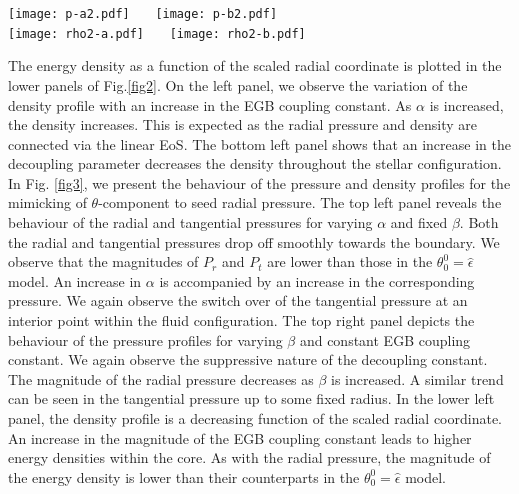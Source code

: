 \documentclass[]{aastex631}
\begin{document}
\begin{figure*}
    \centering
    \texttt{[image: p-a2.pdf]}~~~ \texttt{[image: p-b2.pdf]}\\
     \texttt{[image: rho2-a.pdf]}~~~  \texttt{[image: rho2-b.pdf]}
    \caption{\textit{Top panels} and \textit{Bottom panels} show the effective pressures [ radial ($P_r$) and tangential ($P_{t}$)] effective energy density with respect to $r/R$ for different $\alpha$ and  $\beta$, respectively for the $\theta^1_1=\hat{P}_r$ solution.  We set the numerical values $~L = 0.003/km^2,~N = 10^{-7}/km^4,~
R = 11\,km$ for plotting of left panels and right panels when $\beta=0.02$ and $\alpha=2\, km^2$, respectively.}
    \label{fig3}
\end{figure*}
The energy density as a function of the scaled radial coordinate is plotted in the lower panels of Fig.\ref{fig2}. On the left panel, we observe the variation of the density profile with an increase in the EGB coupling constant. As $\alpha$ is increased, the density increases. This is expected as the radial pressure and density are connected via the linear EoS. The bottom left panel shows that an increase in the decoupling parameter decreases the density throughout the stellar configuration. \\
In Fig. \ref{fig3}, we present the behaviour of the pressure and density profiles for the mimicking of $\theta$-component to seed radial pressure. The top left panel reveals the behaviour of the radial and tangential pressures for varying $\alpha$ and fixed $\beta$. Both the radial and tangential pressures drop off smoothly towards the boundary. We observe that the magnitudes of $P_r$ and $P_t$ are lower than those in the  $\theta^0_0 =\hat{\epsilon}$ model. An increase in $\alpha$ is accompanied by an increase in the corresponding pressure. We again observe the switch over of the tangential pressure at an interior point within the fluid configuration. The top right panel depicts the behaviour of the pressure profiles for varying $\beta$ and constant EGB coupling constant. We again observe the suppressive nature of the decoupling constant. The magnitude of the radial pressure decreases as $\beta$ is increased. A similar trend can be seen in the tangential pressure up to some fixed radius. In the lower left panel, the density profile is a decreasing function of the scaled radial coordinate. An increase in the magnitude of the EGB coupling constant leads to higher energy densities within the core. As with the radial pressure, the magnitude of the energy density is lower than their counterparts in the $\theta^0_0 =\hat{\epsilon}$ model.\\
\end{document}
